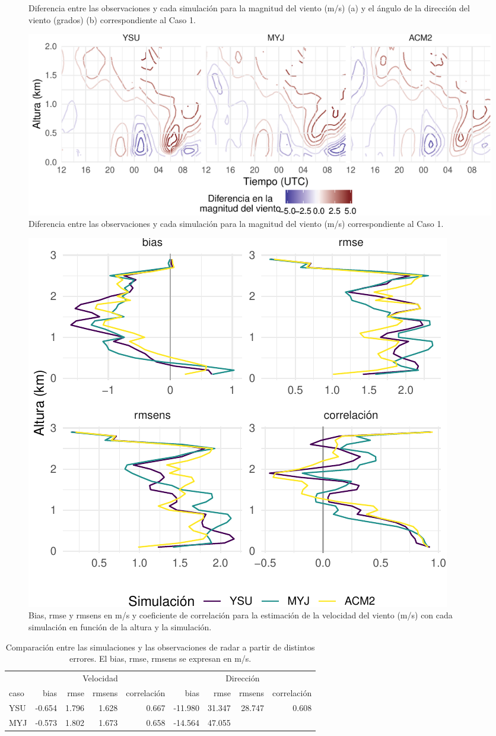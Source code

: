 \documentclass[12pt,spanish,oneside, a4paper]{book}
\begin{document}
\begin{figure}
\caption{Diferencia entre las observaciones y cada simulación para la magnitud del viento (m/s) (a) y el ángulo de la dirección del viento (grados) (b) correspondiente al Caso 1. \label{dif}}\label{fig:diferencia}
\end{figure}

\begin{figure}
\centering
\includegraphics{00_Paper_files/figure-latex/diff_spd-1.pdf}
\caption{Diferencia entre las observaciones y cada simulación para la
magnitud del viento (m/s) correspondiente al Caso 1. \label{dif}}
\end{figure}

\begin{figure}

{\centering \includegraphics{00_Paper_files/figure-latex/err-spd-1} 

}

\caption{Bias, rmse y rmsens en m/s y coeficiente de correlación para la estimación de la velocidad del viento (m/s) con cada simulación en función de la altura y la simulación. \label{err-spd}}\label{fig:err-spd}
\end{figure}

\begin{table}

\caption{\label{tab:err-tabla}Comparación entre las simulaciones y las observaciones de radar a partir de distintos errores. El bias, rmse, rmsens se expresan en m/s. \label{err}}
\centering
\begin{tabular}[t]{lrrrrrrrr}
\toprule
\multicolumn{1}{c}{ } & \multicolumn{4}{c}{Velocidad} & \multicolumn{4}{c}{Dirección} \\
\cmidrule(l{2pt}r{2pt}){2-5} \cmidrule(l{2pt}r{2pt}){6-9}
caso & bias & rmse & rmsens & correlación & bias & rmse & rmsens & correlación\\
\midrule
YSU & -0.654 & 1.796 & 1.628 & 0.667 & -11.980 & 31.347 & 28.747 & 0.608\\
MYJ & -0.573 & 1.802 & 1.673 & 0.658 & -14.564 & 47.055 &
\end{tabular}
\end{table}
\end{document}
